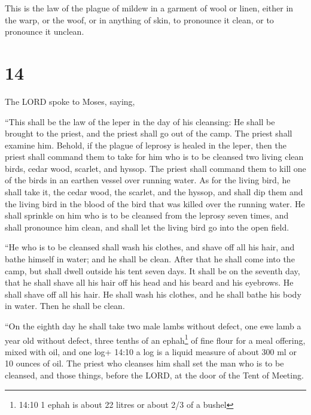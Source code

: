  This is the law of the plague of mildew in a garment of
wool or linen, either in the warp, or the woof, or in anything of skin,
to pronounce it clean, or to pronounce it unclean.

\hypertarget{section-13}{%
\section{14}\label{section-13}}

 The LORD spoke to Moses, saying,

 ``This shall be the law of the leper in the day of his
cleansing: He shall be brought to the priest,  and the
priest shall go out of the camp. The priest shall examine him. Behold,
if the plague of leprosy is healed in the leper,  then the
priest shall command them to take for him who is to be cleansed two
living clean birds, cedar wood, scarlet, and hyssop.  The
priest shall command them to kill one of the birds in an earthen vessel
over running water.  As for the living bird, he shall take
it, the cedar wood, the scarlet, and the hyssop, and shall dip them and
the living bird in the blood of the bird that was killed over the
running water.  He shall sprinkle on him who is to be
cleansed from the leprosy seven times, and shall pronounce him clean,
and shall let the living bird go into the open field.

 ``He who is to be cleansed shall wash his clothes, and
shave off all his hair, and bathe himself in water; and he shall be
clean. After that he shall come into the camp, but shall dwell outside
his tent seven days.  It shall be on the seventh day, that
he shall shave all his hair off his head and his beard and his eyebrows.
He shall shave off all his hair. He shall wash his clothes, and he shall
bathe his body in water. Then he shall be clean.

 ``On the eighth day he shall take two male lambs without
defect, one ewe lamb a year old without defect, three tenths of an
ephah\footnote{14:10 1 ephah is about 22 litres or about 2/3 of a bushel}
of fine flour for a meal offering, mixed with oil, and one log+ 14:10 a
log is a liquid measure of about 300 ml or 10 ounces of oil.
 The priest who cleanses him shall set the man who is to be
cleansed, and those things, before the LORD, at the door of the Tent of
Meeting.

